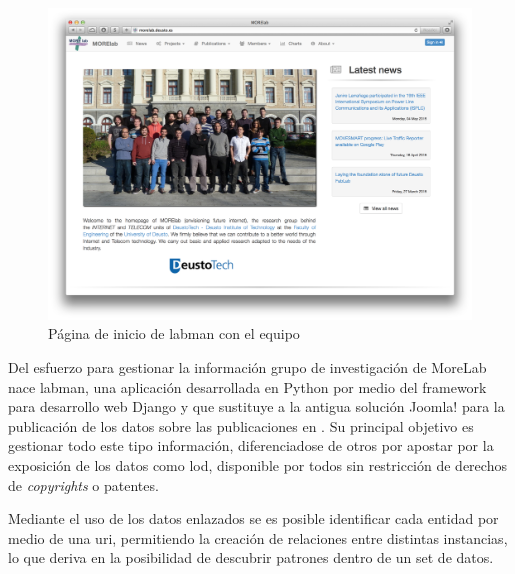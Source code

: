 \begin{figure}[!htp]
	\centering
	\includegraphics[scale=0.13]{fig/labman-homepage}
	\caption{Página de inicio de \acrshort{labman} con el equipo}
\end{figure}

Del esfuerzo para gestionar la información grupo de investigación de MoreLab nace \acrshort{labman}, una aplicación desarrollada en Python\cite{Python} por medio del framework para desarrollo web Django\cite{Django} y que sustituye a la antigua solución Joomla! para la publicación de los datos sobre las publicaciones en \cite{RDF}. Su principal objetivo es gestionar todo este tipo información, diferenciadose de otros  por apostar por la exposición de los datos como \acrlong{lod}\cite{linkeddata}, disponible por todos sin restricción de derechos de \textit{copyrights} o patentes.

Mediante el uso de los datos enlazados se es posible identificar cada entidad por medio de una \acrshort{uri}, permitiendo la creación de relaciones entre distintas instancias, lo que deriva en la posibilidad de descubrir patrones dentro de un set de datos.



\cite{pena_visual_2014}